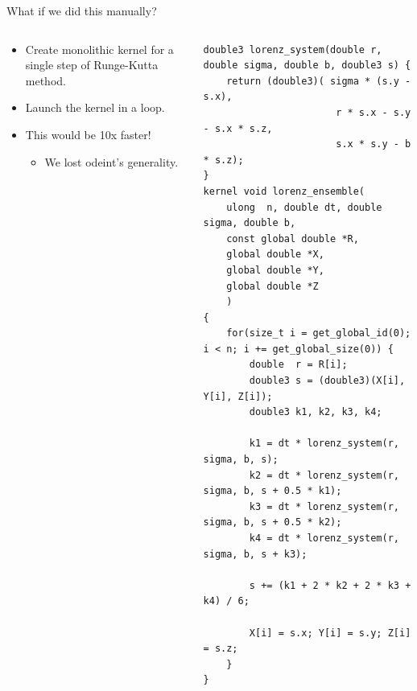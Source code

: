 \documentclass[@BEAMER_OPTIONS@]{beamer}
\begin{document}
\begin{frame}[fragile]{What if we did this manually?}
    \begin{columns}
        \begin{column}{0.45\textwidth}
            \begin{itemize}
                \item Create monolithic kernel for a single step of Runge-Kutta
                    method.
                \item Launch the kernel in a loop.
                    \vspace{\baselineskip}
                \item This would be 10x faster!
                    \begin{itemize}
                        \item<2|alert@2> We lost odeint's generality.
                    \end{itemize}
            \end{itemize}
        \end{column} \quad \quad
        \begin{column}{0.5\textwidth}
            \begin{exampleblock}{}
                \begin{adjustbox}{width=0.95\textwidth,height=0.95\textheight,keepaspectratio}
                    \begin{lstlisting}
double3 lorenz_system(double r, double sigma, double b, double3 s) {
    return (double3)( sigma * (s.y - s.x),
                       r * s.x - s.y - s.x * s.z,
                       s.x * s.y - b * s.z);
}
kernel void lorenz_ensemble(
    ulong  n, double dt, double sigma, double b,
    const global double *R,
    global double *X,
    global double *Y,
    global double *Z
    )
{
    for(size_t i = get_global_id(0); i < n; i += get_global_size(0)) {
        double  r = R[i];
        double3 s = (double3)(X[i], Y[i], Z[i]);
        double3 k1, k2, k3, k4;

        k1 = dt * lorenz_system(r, sigma, b, s);
        k2 = dt * lorenz_system(r, sigma, b, s + 0.5 * k1);
        k3 = dt * lorenz_system(r, sigma, b, s + 0.5 * k2);
        k4 = dt * lorenz_system(r, sigma, b, s + k3);

        s += (k1 + 2 * k2 + 2 * k3 + k4) / 6;

        X[i] = s.x; Y[i] = s.y; Z[i] = s.z;
    }
}
                    \end{lstlisting}
                \end{adjustbox}
            \end{exampleblock}
        \end{column}
    \end{columns}
\end{frame}
\end{document}

